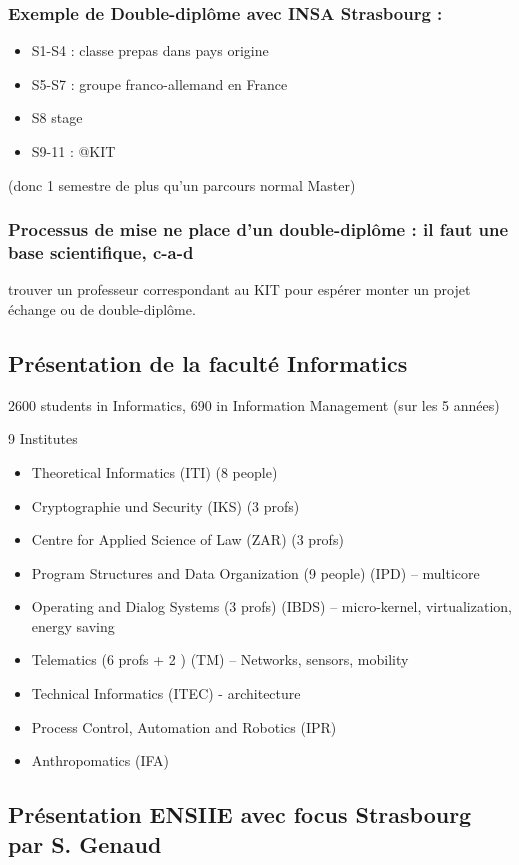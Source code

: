 \documentclass[11pt]{article}
\begin{document}
\subsubsection{Exemple de Double-diplôme avec INSA Strasbourg :}
\label{sec-2-1-3}

\begin{itemize}
\item S1-S4 : classe prepas dans pays origine
\item S5-S7 : groupe franco-allemand en France
\item S8 stage
\item S9-11 : @KIT
\end{itemize}
(donc 1 semestre de plus qu'un parcours normal Master)
\subsubsection{Processus de mise ne place d'un double-diplôme : il faut une base scientifique, c-a-d}
\label{sec-2-1-4}

    trouver un professeur correspondant au KIT pour espérer monter un projet échange
    ou de double-diplôme.
\subsection{Présentation de la faculté Informatics}
\label{sec-2-2}


2600 students in Informatics, 690 in Information Management (sur les 5 années)

9 Institutes
\begin{itemize}
\item Theoretical Informatics (ITI)  (8 people)
\item Cryptographie und Security (IKS) (3 profs)
\item Centre for Applied Science of Law  (ZAR) (3 profs)
\item Program Structures and Data Organization (9 people) (IPD) -- multicore
\item Operating and Dialog Systems (3 profs) (IBDS) -- micro-kernel, virtualization, energy saving
\item Telematics (6 profs + 2 ) (TM)  -- Networks, sensors, mobility
\item Technical Informatics (ITEC) - architecture
\item Process Control, Automation and Robotics (IPR)
\item Anthropomatics (IFA)
\end{itemize}
\subsection{Présentation ENSIIE avec focus Strasbourg par S. Genaud}
\label{sec-2-3}
\end{document}
